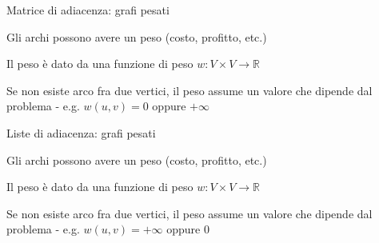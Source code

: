 \begin{frame}{Matrice di adiacenza: grafi pesati}

\begin{myboxtitle}
\BI
\item Gli archi possono avere un \alert{peso} (costo, profitto, etc.)
\item Il peso è dato da una funzione di peso \alert{$w: V \times V \rightarrow \mathbb{R}$}
\item Se non esiste arco fra due vertici, il peso assume un valore che dipende dal problema - e.g. $w(u,v) = 0$ oppure $+\infty$
\EI
\end{myboxtitle}

\vspace{-9pt}

\end{frame}

\begin{frame}{Liste di adiacenza: grafi pesati}

\vspace{-6pt}
\begin{myboxtitle}
\BI
\item Gli archi possono avere un \alert{peso} (costo, profitto, etc.)
\item Il peso è dato da una funzione di peso \alert{$w: V \times V \rightarrow \mathbb{R}$}
\item Se non esiste arco fra due vertici, il peso assume un valore che dipende dal problema - e.g. $w(u,v) = +\infty$ oppure $0$
\EI
\end{myboxtitle}

\vspace{-9pt}

\end{frame}

